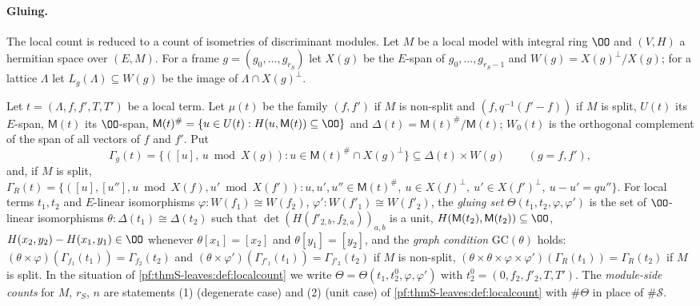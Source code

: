 \paragraph{Gluing.} The local count is reduced to a count of isometries of discriminant modules. Let $M$ be a local model with
integral ring $\OO$ and $(V,H)$ a hermitian space over $(E,M)$. For a frame $g=(g_0,\dots,g_{r_S})$ let $X(g)$ be the $E$-span of
$g_0,\dots,g_{r_S-1}$ and $W(g)=X(g)^\perp/X(g)$; for a lattice $\Lambda$ let $L_g(\Lambda)\subseteq W(g)$ be the image of $\Lambda\cap X(g)^\perp$.

\begin{definition}\label{pf:thmS-leaves:def:theta}
Let $t=(\Lambda,f,f',T,T')$ be a local term. Let $\mu(t)$ be the family $(f,f')$ if $M$ is non-split and $(f,q^{-1}(f'-f))$ if $M$ is
split, $U(t)$ its $E$-span, $\mathsf M(t)$ its $\OO$-span, $\mathsf M(t)^\#=\{u\in U(t):H(u,\mathsf M(t))\subseteq\OO\}$ and
$\Delta(t)=\mathsf M(t)^\#/\mathsf M(t)$; $W_0(t)$ is the orthogonal complement of the span of all vectors of $f$ and $f'$. Put
\[
\Gamma_g(t)=\{([u],\,u\bmod X(g)):u\in\mathsf M(t)^\#\cap X(g)^\perp\}\subseteq\Delta(t)\times W(g)\qquad(g=f,f'),
\]
and, if $M$ is split,
$\Gamma_R(t)=\{([u],[u''],u\bmod X(f),u'\bmod X(f')):u,u',u''\in\mathsf M(t)^\#,\ u\in X(f)^\perp,\ u'\in X(f')^\perp,\ u-u'=qu''\}$.
For local terms $t_1,t_2$ and $E$-linear isomorphisms $\varphi:W(f_1)\cong W(f_2)$, $\varphi':W(f'_1)\cong W(f'_2)$, the \emph{gluing set}
$\Theta(t_1,t_2,\varphi,\varphi')$ is the set of $\OO$-linear isomorphisms $\theta:\Delta(t_1)\cong\Delta(t_2)$ such that $\det(H(f'_{2,b},f_{2,a}))_{a,b}$
is a unit, $H(\mathsf M(t_2),\mathsf M(t_2))\subseteq\OO$, $H(x_2,y_2)-H(x_1,y_1)\in\OO$ whenever $\theta[x_1]=[x_2]$ and $\theta[y_1]=[y_2]$, and the
\emph{graph condition} $\mathrm{GC}(\theta)$ holds: $(\theta\times\varphi)(\Gamma_{f_1}(t_1))=\Gamma_{f_2}(t_2)$ and
$(\theta\times\varphi')(\Gamma_{f'_1}(t_1))=\Gamma_{f'_2}(t_2)$ if $M$ is non-split, $(\theta\times\theta\times\varphi\times\varphi')(\Gamma_R(t_1))=\Gamma_R(t_2)$ if $M$
is split. In the situation of \cref{pf:thmS-leaves:def:localcount} we write $\Theta=\Theta(t_1,t_2^0,\varphi,\varphi')$ with
$t_2^0=(0,f_2,f'_2,T,T')$. The \emph{module-side counts} for $M$, $r_S$, $n$ are statements (1) (degenerate case) and (2) (unit case)
of \cref{pf:thmS-leaves:def:localcount} with $\#\Theta$ in place of $\#\mathcal S$.
\end{definition}


